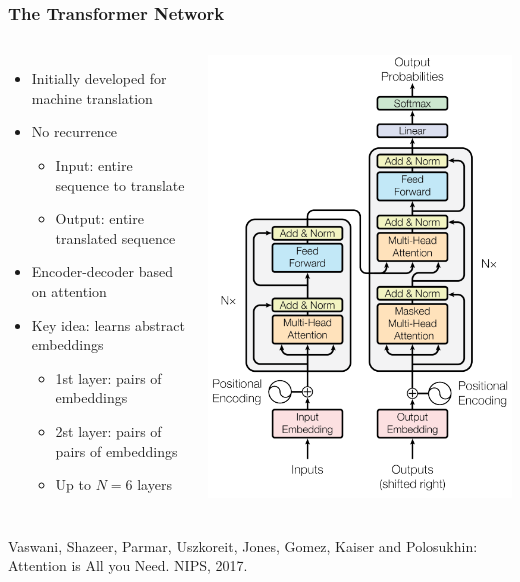 \documentclass[10pt]{beamer}
\begin{document}
\begin{frame}
  \frametitle{The Transformer Network}
  \begin{columns}
\begin{itemize}
\setlength\itemsep{.8em}
\item Initially developed for machine translation
\item No recurrence
\begin{itemize}
\item Input: entire sequence to translate
\item Output: entire translated sequence
\end{itemize}
\item Encoder-decoder based on attention 
\item Key idea: learns abstract embeddings
\begin{itemize}
\item 1st layer: pairs of embeddings
\item 2st layer: pairs of pairs of embeddings
\item Up to $N=6$ layers
\end{itemize}
\end{itemize}
\begin{center}
	\includegraphics[width=.7\columnwidth]{images/transf}
\end{center}
    \end{columns}
\vspace{1cm}
\scriptsize{Vaswani, Shazeer, Parmar, Uszkoreit, Jones, Gomez, Kaiser and Polosukhin: Attention is All you Need. NIPS, 2017.}
\end{frame}
\end{document}

